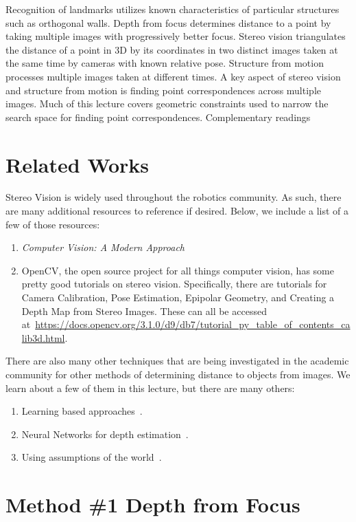 \documentclass[twoside]{article}
\begin{document}
	Recognition of landmarks utilizes known characteristics of particular structures such as orthogonal walls. Depth from focus determines distance to a point by taking multiple images with progressively better focus. Stereo vision triangulates the distance of a point in 3D by its coordinates in two distinct images taken at the same time by cameras with known relative pose. Structure from motion processes multiple images taken at different times. A key aspect of stereo vision and structure from motion is finding point correspondences across multiple images. Much of this lecture covers geometric constraints used to narrow the search space for finding point correspondences. Complementary readings \cite{SNS, FP}

\section{Related Works}
Stereo Vision is widely used throughout the robotics community. As such, there are many additional resources to reference if desired.
Below, we include a list of a few of those resources:
\begin{enumerate}
	\item \textit{Computer Vision: A Modern Approach}~\cite{FP}
	\item OpenCV, the open source project for all things computer vision, has some pretty good tutorials on stereo vision. 
	Specifically, there are tutorials for Camera Calibration, Pose Estimation, Epipolar Geometry, and Creating a Depth Map from Stereo Images. 
	These can all be accessed at~\url{https://docs.opencv.org/3.1.0/d9/db7/tutorial_py_table_of_contents_calib3d.html}.
\end{enumerate}
There are also many other techniques that are being investigated in the academic community for other methods of determining distance to objects from images. We learn about a few of them in this lecture, but there are many others:
\begin{enumerate}
	\item Learning based approaches~\cite{Saxena_depth_est}.
	\item Neural Networks for depth estimation~\cite{nips_depth,single_image_depth,Schennings1167554}.
	\item Using assumptions of the world~\cite{effecient_exact,inside_box}.
\end{enumerate}

\section{Method \#1 Depth from Focus}
\end{document}
